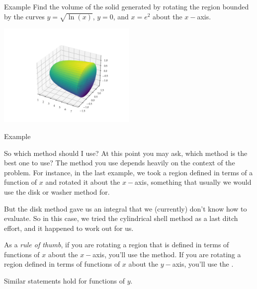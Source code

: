 \documentclass[presentation]{beamer}
\begin{document}
\begin{frame}[label={sec:org0703e5d}]{Example}
Find the volume of the solid generated by rotating the region bounded
by the curves \(y = \sqrt{\ln \left( x \right)}\), \(y = 0\), and \(x = e^2\) about the \(x-\)axis.

\begin{center}
\includegraphics[width=0.5\textwidth]{../img/day008-ex04.png}
\end{center}
\vspace{10in}
\end{frame}

\begin{frame}[label={sec:org8527eec}]{Example}
\end{frame}


\begin{frame}[label={sec:orgb479809}]{So which method should I use?}
At this point you may ask, which method is the best one to use?  
The method you use depends heavily on the context of the problem.  For
instance, in the last example, we took a region defined in terms of a
function of \(x\) and rotated it about the \(x-\)axis, something
that usually we would use the disk or washer method for. 

But the disk method gave us an integral that we (currently) don't know
how to evaluate.  So in this case, we tried the cylindrical shell
method as a last ditch effort, and it happened to work out for us.

As a \emph{rule of thumb}, if you are rotating a region that is defined in
terms of functions of \(x\) about the \(x-\)axis, you'll
\uline{\hspace*{1in}} use the \uline{\hspace*{1in}} method.  If you are
rotating a region defined in terms of functions of \(x\) about the
\(y-\)axis, you'll \uline{\hspace*{1in}} use the \uline{\hspace*{1in}}.

Similar statements hold for functions of \(y\).
\end{frame}
\end{document}
